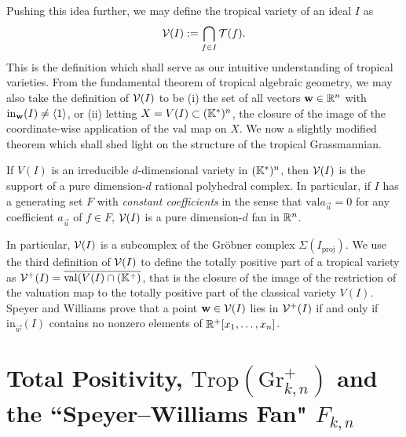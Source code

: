 \documentclass[12pt,letter]{article}
\newcommand{\gr}{\mathrm{Gr}}
\newcommand{\trop}{\mathrm{Trop}}
\newcommand{\val}{\mathrm{val}}
\newcommand{\ins}{\mathrm{in}}
\newcommand{\proj}{\mathrm{proj}}
\begin{document}
Pushing this idea further, we may define the tropical variety of an ideal $I$ as $${\mathcal V}(I):=\bigcap_{f\in I}{\mathcal T}(f).$$
This is the definition which shall serve as our intuitive understanding of tropical varieties. From the fundamental theorem of tropical algebraic geometry, we may also take the definition of ${\mathcal V}(I)$ to be (i) the set of all vectors $\mathbf{w}\in {\mathbb R}^n$ with $\ins_\vec{w}(I)\neq \idl{1}$, or (ii) letting $X=V(I)\subset ({\mathbb K}^*)^n$, the closure of the image of the coordinate-wise application of the $\val$ map on $X$. We now a slightly modified theorem which shall shed light on the structure of the tropical Grassmannian. \begin{theorem}\label{struc}
If $V(I)$ is an irreducible $d$-dimensional variety in $({\mathbb K}^*)^n$, then ${\mathcal V}(I)$ is the support of a pure dimension-$d$ rational polyhedral complex. In particular, if $I$ has a generating set $F$ with \emph{constant coefficients} in the sense that $\val{a_\vec{u}}=0$ for any coefficient $a_\vec{u}$ of $f\in F$, ${\mathcal V}(I)$ is a pure dimension-$d$ fan in ${\mathbb R}^{n}$.
\end{theorem}
In particular, ${\mathcal V}(I)$ is a subcomplex of the Gr\"obner complex $\Sigma(I_\proj)$.
We use the third definition of ${\mathcal V}(I)$ to define the totally positive part of a tropical variety as $\Vcal^+(I)=\acl{\val(V(I)\cap (\KK^+)}$, that is the closure of the image of the restriction of the valuation map to the totally positive part of the classical variety $V(I)$. Speyer and Williams \cite{WiSp05} prove that a point $\mathbf{w}\in {\mathcal V}(I)$ lies in ${\mathcal V}^+(I)$ if and only if $\ins_\vec{w}(I)$ contains no nonzero elements of ${\mathbb R}^+[x_1,\hdots,x_n]$.

\section{Total Positivity, $\trop \left(\gr^+_{k,n}\right)$ and the ``Speyer--Williams Fan" $F_{k,n}$}
\end{document}
